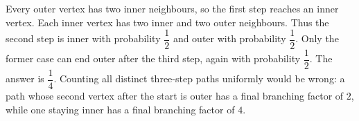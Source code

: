 Every outer vertex has two inner neighbours, so the first step reaches an inner vertex. Each inner vertex has two inner and two outer neighbours. Thus the second step is inner with probability $\dfrac{1}{2}$ and outer with probability $\dfrac{1}{2}$. Only the former case can end outer after the third step, again with probability $\dfrac{1}{2}$. The answer is $\boxed{\dfrac{1}{4}}$. Counting all distinct three-step paths uniformly would be wrong: a path whose second vertex after the start is outer has a final branching factor of $2$, while one staying inner has a final branching factor of $4$.
